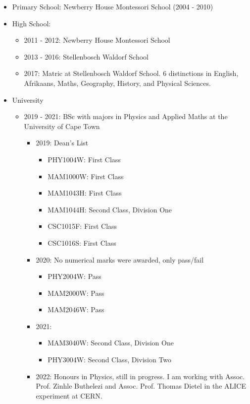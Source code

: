 \documentclass[11pt]{article}
\numberwithin{equation}{section}
\numberwithin{figure}{section}
\numberwithin{table}{section}
\begin{document}
\begin{itemize}
    \item Primary School: Newberry House Montessori School (2004 - 2010)
    \item High School:
    \begin{itemize}
        \item 2011 - 2012: Newberry House Montessori School
        \item 2013 - 2016: Stellenbosch Waldorf School
        \item 2017: Matric at Stellenbosch Waldorf School. 6 distinctions in English, Afrikaans, Maths, Geography, History, and Physical Sciences.
    \end{itemize}
    \item University
    \begin{itemize}
        \item 2019 - 2021: BSc with majors in Physics and Applied Maths at the University of Cape Town
        \begin{itemize}
            \item 2019: Dean's List
            \begin{itemize}
                \item PHY1004W: First Class
                \item MAM1000W: First Class
                \item MAM1043H: First Class
                \item MAM1044H: Second Class, Division One
                \item CSC1015F: First Class
                \item CSC1016S: First Class
            \end{itemize}
            \item 2020: No numerical marks were awarded, only pass/fail
            \begin{itemize}
                \item PHY2004W: Pass
                \item MAM2000W: Pass
                \item MAM2046W: Pass
            \end{itemize}
            \item 2021: 
            \begin{itemize}
                \item MAM3040W: Second Class, Division One
                \item PHY3004W: Second Class, Division Two
            \end{itemize}
            \item 2022: Honours in Physics, still in progress. I am working with Assoc. Prof. Zinhle Buthelezi and Assoc. Prof. Thomas Dietel in the ALICE experiment at CERN. 
        \end{itemize}
    \end{itemize}
\end{itemize}
\end{document}
